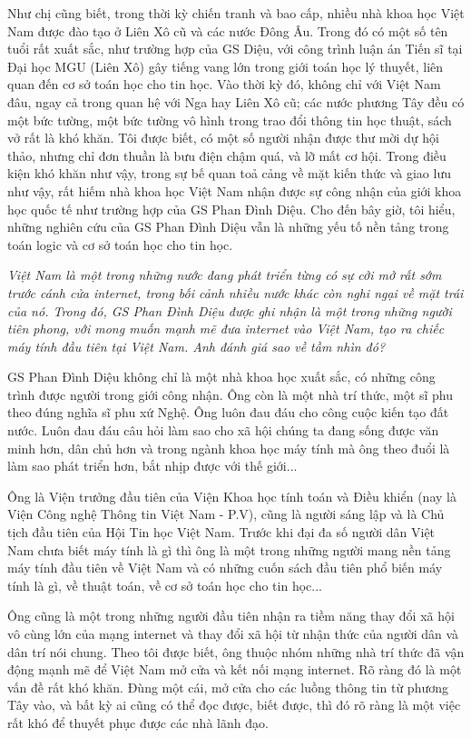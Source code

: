 Như chị cũng biết, trong thời kỳ chiến tranh và bao cấp, nhiều nhà khoa học Việt Nam được đào tạo ở Liên Xô cũ và các nước Đông Âu. Trong đó có một số tên tuổi rất xuất sắc, như trường hợp của GS Diệu, với công trình luận án Tiến sĩ tại Đại học MGU (Liên Xô) gây tiếng vang lớn trong giới toán học lý thuyết, liên quan đến cơ sở toán học cho tin học. Vào thời kỳ đó, không chỉ với Việt Nam đâu, ngay cả trong quan hệ với Nga hay Liên Xô cũ; các nước phương Tây đều có một bức tường, một bức tường vô hình trong trao đổi thông tin học thuật, sách vở rất là khó khăn. Tôi được biết, có một số người nhận được thư mời dự hội thảo, nhưng chỉ đơn thuần là bưu điện chậm quá, và lỡ mất cơ hội. Trong điều kiện khó khăn như vậy, trong sự bế quan toả cảng về mặt kiến thức và giao lưu như vậy, rất hiếm nhà khoa học Việt Nam nhận được sự công nhận của giới khoa học quốc tế như trường hợp của GS Phan Đình Diệu. Cho đến bây giờ, tôi hiểu, những nghiên cứu của GS Phan Đình Diệu vẫn là những yếu tố nền tảng trong toán logic và cơ sở toán học cho tin học.

\emph{Việt Nam là một trong những nước đang phát triển từng có sự cởi mở rất sớm trước cánh cửa internet, trong bối cảnh nhiều nước khác còn nghi ngại về mặt trái của nó. Trong đó, GS Phan Đình Diệu được ghi nhận là một trong những người tiên phong, với mong muốn mạnh mẽ đưa internet vào Việt Nam, tạo ra chiếc máy tính đầu tiên tại Việt Nam. Anh đánh giá sao về tầm nhìn đó?}

GS Phan Đình Diệu không chỉ là một nhà khoa học xuất sắc, có những công trình được người trong giới công nhận. Ông còn là một nhà trí thức, một sĩ phu theo đúng nghĩa sĩ phu xứ Nghệ. Ông luôn đau đáu cho công cuộc kiến tạo đất nước. Luôn đau đáu câu hỏi làm sao cho xã hội chúng ta đang sống được văn minh hơn, dân chủ hơn và trong ngành khoa học máy tính mà ông theo đuổi là làm sao phát triển hơn, bắt nhịp được với thế giới...

Ông là Viện trưởng đầu tiên của Viện Khoa học tính toán và Điều khiển (nay là Viện Công nghệ Thông tin Việt Nam - P.V), cũng là người sáng lập và là Chủ tịch đầu tiên của Hội Tin học Việt Nam. Trước khi đại đa số người dân Việt Nam chưa biết máy tính là gì thì ông là một trong những người mang nền tảng máy tính đầu tiên về Việt Nam và có những cuốn sách đầu tiên phổ biến máy tính là gì, về thuật toán, về cơ sở toán học cho tin học...   

Ông cũng là một trong những người đầu tiên nhận ra tiềm năng thay đổi xã hội vô cùng lớn của mạng internet và thay đổi xã hội từ nhận thức của người dân và dân trí nói chung. Theo tôi được biết, ông thuộc nhóm những nhà trí thức đã vận động mạnh mẽ để Việt Nam mở cửa và kết nối mạng internet. Rõ ràng đó là một vấn đề rất khó khăn. Đùng một cái, mở cửa cho các luồng thông tin từ phương Tây vào, và bất kỳ ai cũng có thể đọc được, biết được, thì đó rõ ràng là một việc rất  khó để thuyết phục được các nhà lãnh đạo. 

